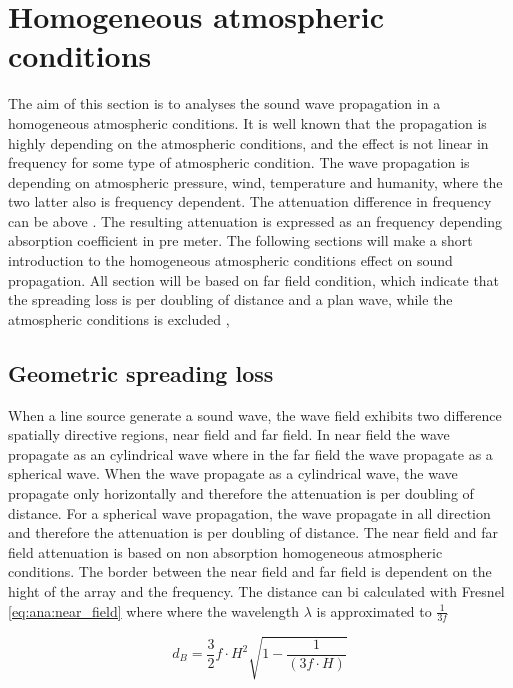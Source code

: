 \section{Homogeneous atmospheric conditions}
The aim of this section is to analyses the sound wave propagation in a homogeneous atmospheric conditions. It is well known that the propagation is highly depending on the atmospheric conditions, and the effect is not linear in frequency for some type of atmospheric condition. The wave propagation is depending on atmospheric pressure, wind, temperature and humanity, where the two latter also is frequency dependent. The attenuation difference in frequency can be above  \citep{corteel2017large}. The resulting attenuation is expressed as an frequency depending absorption coefficient in \db pre \si{meter}. The following sections will make a short introduction to the homogeneous atmospheric conditions effect on sound propagation. All section will be based on far field condition, which indicate that the spreading loss is  per doubling of distance and a plan wave, while the atmospheric conditions is excluded \citep{bauman2001wavefront}, 

\subsection{Geometric spreading loss}
When a line source generate a sound wave, the wave field exhibits two difference spatially directive regions, near field and far field. In near field the wave propagate as an cylindrical wave where in the far field the wave propagate as a spherical wave. When the wave propagate as a cylindrical wave, the wave propagate only horizontally and therefore the attenuation is  per doubling of distance. For a spherical wave propagation, the wave propagate in all direction and therefore the attenuation is  per doubling of distance. The near field and far field attenuation is based on non absorption homogeneous atmospheric conditions. The border between the near field and far field is dependent on the hight of the array and the frequency. The distance can bi calculated with Fresnel \autoref{eq:ana:near_field} where where the wavelength $\lambda$ is approximated to $\frac{1}{3f}$ \citep{bauman2001wavefront}

\begin{equation}\label{eq:ana:near_field}
d_{B} = \frac{3}{2}f \cdot H^{2}\sqrt{1-\frac{1}{(3f \cdot H)}}
\end{equation}

